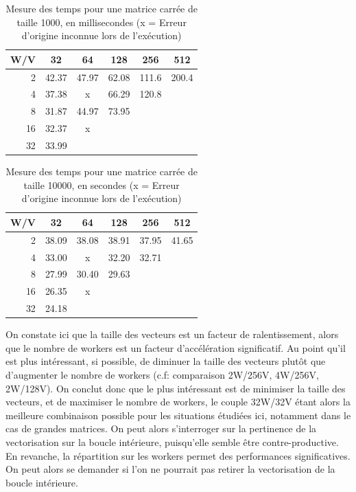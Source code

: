 \documentclass{article}
\begin{document}
\begin{table}[h]
	\centering
	\begin{tabular}{r|ccccc}
		W/V & 32 & 64 & 128 & 256 & 512 \\
		\hline
		2 & 42.37 & 47.97 & 62.08 & 111.6 & 200.4 \\
		4 & 37.38 & x & 66.29 & 120.8 & \\
		8 & 31.87 & 44.97 & 73.95 & & \\
		16 & 32.37 & x & & & \\
		32 & 33.99 & & & & \\
	\end{tabular}
	\caption{Mesure des temps pour une matrice carrée de taille 1000, en millisecondes (x = Erreur d'origine inconnue lors de l'exécution)}
\end{table}
\begin{table}[h]
	\centering
	\begin{tabular}{r|ccccc}
		W/V & 32 & 64 & 128 & 256 & 512 \\
		\hline
		2 & 38.09 & 38.08 & 38.91 & 37.95 & 41.65 \\
		4 & 33.00 & x & 32.20 & 32.71 & \\
		8 & 27.99 & 30.40 & 29.63 & & \\
		16 & 26.35 & x & & & \\
		32 & 24.18 & & & & \\
	\end{tabular}
	\caption{Mesure des temps pour une matrice carrée de taille 10000, en secondes (x = Erreur d'origine inconnue lors de l'exécution)}
\end{table}

On constate ici que la taille des vecteurs est un facteur de ralentissement, alors que le nombre de workers est un facteur d'accélération significatif. Au point qu'il est plus intéressant, si possible, de diminuer la taille des vecteurs plutôt que d'augmenter le nombre de workers (c.f: comparaison 2W/256V, 4W/256V, 2W/128V). On conclut donc que le plus intéressant est de minimiser la taille des vecteurs, et de maximiser le nombre de workers, le couple 32W/32V étant alors la meilleure combinaison possible pour les situations étudiées ici, notamment dans le cas de grandes matrices.
On peut alors s'interroger sur la pertinence de la vectorisation sur la boucle intérieure, puisqu'elle semble être contre-productive. En revanche, la répartition sur les workers permet des performances significatives. On peut alors se demander si l'on ne pourrait pas retirer la vectorisation de la boucle intérieure.
\end{document}
